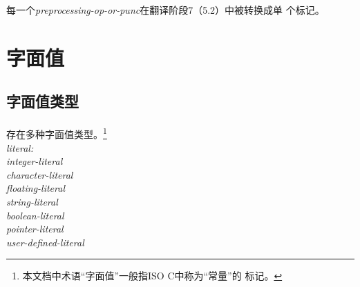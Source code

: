 \noindent 每一个\textit{preprocessing-op-or-punc}在翻译阶段7（5.2）中被转换成单
个标记。

\section{字面值}
\subsection{字面值类型}
\paragraph{}
存在多种字面值类型。\footnote{本文档中术语``字面值''一般指ISO C中称为``常量''的
标记。}                                                                       \\
\noindent \mbox{\qquad \textit{literal:}}                                     \\
\mbox{\qquad \qquad \textit{integer-literal}}                                 \\
\mbox{\qquad \qquad \textit{character-literal}}                               \\
\mbox{\qquad \qquad \textit{floating-literal}}                                \\
\mbox{\qquad \qquad \textit{string-literal}}                                  \\
\mbox{\qquad \qquad \textit{boolean-literal}}                                 \\
\mbox{\qquad \qquad \textit{pointer-literal}}                                 \\
\mbox{\qquad \qquad \textit{user-defined-literal}}                            \\

